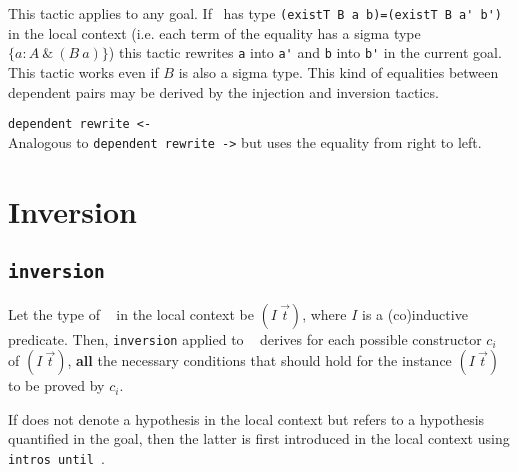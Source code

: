 This tactic applies to any goal.  If \ident\ has type 
\verb+(existT B a b)=(existT B a' b')+ 
in the local context (i.e. each term of the
equality has a sigma type $\{ a:A~ \&~(B~a)\}$) this tactic rewrites
\verb+a+ into \verb+a'+ and \verb+b+ into \verb+b'+ in the current
goal. This tactic works even if $B$ is also a sigma type.  This kind
of equalities between dependent pairs may be derived by the injection
and inversion tactics.

\begin{Variants}
\item{\tt dependent rewrite <- {\ident}}
 \\
Analogous to {\tt dependent rewrite ->} but uses the equality from
right to left.
\end{Variants}

\section{Inversion
\label{inversion}}

\subsection{\tt inversion {\ident}
}

Let the type of \ident~ in the local context be $(I~\vec{t})$,
where $I$ is a (co)inductive predicate. Then,
\texttt{inversion} applied to \ident~ derives for each possible
constructor $c_i$ of $(I~\vec{t})$, {\bf all} the necessary
conditions that should hold for the instance $(I~\vec{t})$ to be
proved by $c_i$.

\Rem If {\ident} does not denote a hypothesis in the local context
but refers to a hypothesis quantified in the goal, then the
latter is first introduced in the local context using
\texttt{intros until \ident}.

